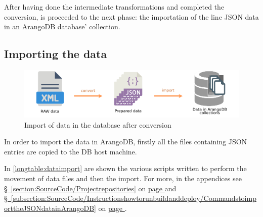 After having done the intermediate transformations and completed the conversion, is proceeded to the next phase: the importation of the line JSON data in an ArangoDB database' collection.

\subsection{Importing the data} \label{subsection:ImplementingtheWebApp/Thedata/Importingthedata}
\begin{figure}[H]%
	\centering%
	\includegraphics[width=1\textwidth,%
	]{images/chapter4/datatransformationsconvertimport.pdf}%
	\caption[Import of data in the database after conversion]{Import of data in the database after conversion}%
	\label{fig:datatransformationsconvertimport}%
\end{figure}%

In order to import the data in ArangoDB, firstly all the files containing JSON entries are copied to the DB host machine.

In \hyperref[longtable:dataimport]{\autoref{longtable:dataimport}} are shown the various scripts written to perform the movement of data files and then the import. For more, in the appendices see \hyperref[section:SourceCode/Projectrepositories]{\S\ \ref*{section:SourceCode/Projectrepositories}} on \hyperref[section:SourceCode/Projectrepositories]{page \pageref*{section:SourceCode/Projectrepositories}}
and \hyperref[subsection:SourceCode/Instructionshowtorunbuildanddeploy/CommandstoimporttheJSONdatainArangoDB]{\S\ \ref*{subsection:SourceCode/Instructionshowtorunbuildanddeploy/CommandstoimporttheJSONdatainArangoDB}} on \hyperref[subsection:SourceCode/Instructionshowtorunbuildanddeploy/CommandstoimporttheJSONdatainArangoDB]{page \pageref*{subsection:SourceCode/Instructionshowtorunbuildanddeploy/CommandstoimporttheJSONdatainArangoDB}}.

